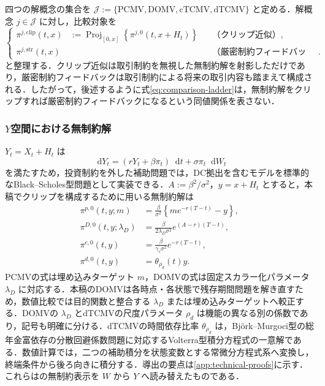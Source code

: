 \documentclass[10pt,a4paper]{article}
\theoremstyle{plain}
\theoremstyle{definition}
\DeclareMathOperator{\Proj}{Proj}
\newcommand{\dd}{\mathop{}\!\mathrm{d}}
\begin{document}
四つの解概念の集合を $\mathcal J:=\{\mathrm{PCMV},\mathrm{DOMV},\mathrm{cTCMV},\mathrm{dTCMV}\}$ と定める．解概念 $j\in\mathcal J$ に対し，比較対象を
\begin{equation}
\left\{
\begin{aligned}
\pi^{j,\mathrm{clip}}(t,x)
&:=\Proj_{[0,x]}\!\left\{\pi^{j,0}(t,x+H_t)\right\}
&&\text{（クリップ近似）},\\
\pi^{j,\mathrm{str}}(t,x)
&&&\text{（厳密制約フィードバック）}.
\end{aligned}
\right.
\label{eq:comparison-ladder}
\end{equation}
と整理する．クリップ近似は取引制約を無視した無制約解を射影しただけであり，厳密制約フィードバックは取引制約による将来の取引内容も踏まえて構成される．したがって，後述するように式\eqref{eq:comparison-ladder}は，無制約解をクリップすれば厳密制約フィードバックになるという同値関係を表さない．

\subsubsection{$Y$空間における無制約解}

$Y_t=X_t+H_t$ は
\[
\dd Y_t=(rY_t+\beta\pi_t)\dd t+\sigma\pi_t\dd W_t
\]
を満たすため，投資制約を外した補助問題では，DC拠出を含むモデルを標準的なBlack--Scholes型問題として実装できる．$A:=\beta^2/\sigma^2$，$y=x+H_t$ とすると，本稿でクリップを構成するために用いる無制約解は
\begin{align}
  \pi^{p,0}(t,y;m)
  &=\frac{\beta}{\sigma^2}\left\{m e^{-r(T-t)}-y\right\},\label{eq:unc-p}\\
  \pi^{D,0}(t,y;\lambda_D)
  &=\frac{\beta}{2\lambda_D\sigma^2}e^{(A-r)(T-t)},\label{eq:unc-D}\\
  \pi^{c,0}(t,y)
  &=\frac{\beta}{\gamma_c\sigma^2}e^{-r(T-t)},\label{eq:unc-c}\\
  \pi^{d,0}(t,y)
  &=\theta_{\rho_d}(t)y.\label{eq:unc-d}
\end{align}
PCMVの式は埋め込みターゲット $m$，DOMVの式は固定スカラー化パラメータ $\lambda_D$ に対応する．本稿のDOMVは各時点・各状態で残存期間問題を解き直すため，数値比較では目的関数と整合する $\lambda_D$ または埋め込みターゲットへ較正する．DOMVの $\lambda_D$ とdTCMVの尺度パラメータ $\rho_d$ は機能の異なる別の係数であり，記号も明確に分ける．dTCMVの時間依存比率 $\theta_{\rho_d}$ は，Björk--Murgoci型の総年金富依存の分散回避係数問題に対応するVolterra型積分方程式の一意解である．数値計算では，二つの補助積分を状態変数とする常微分方程式系へ変換し，終端条件から後ろ向きに積分する．導出の要点は\ref{app:technical-proofs}に示す．これらは\citet{vanStadenDangForsyth2021}の無制約表示を $W$ から $Y$ へ読み替えたものである．
\end{document}
